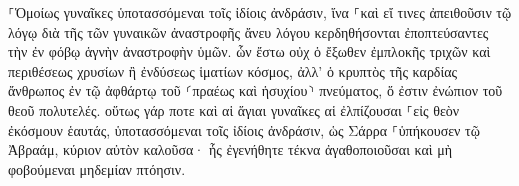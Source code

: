\documentclass{openreader}
\begin{document}
⸀Ὁμοίως γυναῖκες ὑποτασσόμεναι τοῖς ἰδίοις ἀνδράσιν, ἵνα ⸀καὶ εἴ τινες ἀπειθοῦσιν τῷ λόγῳ διὰ τῆς τῶν γυναικῶν ἀναστροφῆς ἄνευ λόγου κερδηθήσονται 
ἐποπτεύσαντες τὴν ἐν φόβῳ ἁγνὴν ἀναστροφὴν ὑμῶν. 
ὧν ἔστω οὐχ ὁ ἔξωθεν ἐμπλοκῆς τριχῶν καὶ περιθέσεως χρυσίων ἢ ἐνδύσεως ἱματίων κόσμος, 
ἀλλ’ ὁ κρυπτὸς τῆς καρδίας ἄνθρωπος ἐν τῷ ἀφθάρτῳ τοῦ ⸂πραέως καὶ ἡσυχίου⸃ πνεύματος, ὅ ἐστιν ἐνώπιον τοῦ θεοῦ πολυτελές. 
οὕτως γάρ ποτε καὶ αἱ ἅγιαι γυναῖκες αἱ ἐλπίζουσαι ⸀εἰς θεὸν ἐκόσμουν ἑαυτάς, ὑποτασσόμεναι τοῖς ἰδίοις ἀνδράσιν, 
ὡς Σάρρα ⸀ὑπήκουσεν τῷ Ἀβραάμ, κύριον αὐτὸν καλοῦσα· ἧς ἐγενήθητε τέκνα ἀγαθοποιοῦσαι καὶ μὴ φοβούμεναι μηδεμίαν πτόησιν. 
\end{document}
